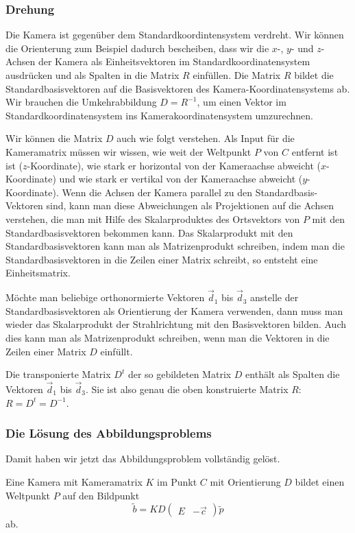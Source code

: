 \subsubsection{Drehung}
Die Kamera ist gegenüber dem Standardkoordintensystem verdreht.
Wir können die Orienterung zum Beispiel dadurch bescheiben, dass wir
die $x$-, $y$- und $z$-Achsen der Kamera als Einheitsvektoren im
Standardkoordinatensystem ausdrücken und als Spalten in die Matrix $R$
einfüllen.
Die Matrix $R$ bildet die Standardbasisvektoren auf die Basisvektoren
des Kamera-Koordinatensystems ab.
Wir brauchen die Umkehrabbildung $D=R^{-1}$, um einen Vektor im
Standardkoordinatensystem ins Kamerakoordinatensystem umzurechnen.

Wir können die Matrix $D$ auch wie folgt verstehen.
Als Input für die Kameramatrix müssen wir wissen, wie weit der Weltpunkt
$P$ von $C$ entfernt ist ist ($z$-Koordinate), wie stark er horizontal
von der Kameraachse abweicht ($x$-Koordinate) und wie stark er vertikal
von der Kameraachse abweicht ($y$-Koordinate).
Wenn die Achsen der Kamera parallel zu den Standardbasis-Vektoren sind,
kann man diese Abweichungen als Projektionen auf die Achsen verstehen,
die man mit Hilfe des Skalarproduktes des Ortsvektors von $P$ mit den
Standardbasisvektoren bekommen kann.
Das Skalarprodukt mit den Standardbasisvektoren kann man als Matrizenprodukt
schreiben, indem man die Standardbasisvektoren in die Zeilen einer Matrix
schreibt, so entsteht eine Einheitsmatrix.

Möchte man beliebige orthonormierte Vektoren $\vec{d}_1$ bis $\vec{d}_3$
anstelle der Standardbasisvektoren als Orientierung der Kamera verwenden,
dann muss man wieder das
Skalarprodukt der Strahlrichtung mit den Basisvektoren bilden.
Auch dies kann man als Matrizenprodukt schreiben, wenn man die Vektoren
in die Zeilen einer Matrix $D$ einfüllt.

Die transponierte Matrix $D^t$ der so gebildeten Matrix $D$ enthält als
Spalten die Vektoren $\vec{d}_1$ bis $\vec{d}_3$.
Sie ist also genau die oben konstruierte Matrix $R$: $R=D^t=D^{-1}$.

\subsubsection{Die Lösung des Abbildungsproblems}
Damit haben wir jetzt das Abbildungsproblem vollständig gelöst.

\begin{satz}
Eine Kamera mit Kameramatrix $K$ im Punkt $C$ mit Orientierung $D$ bildet
einen Weltpunkt $P$ auf den Bildpunkt
\[
\tilde b
=
K D \begin{pmatrix} E&-\vec{c}\end{pmatrix} \tilde p
\]
ab.
\end{satz}

